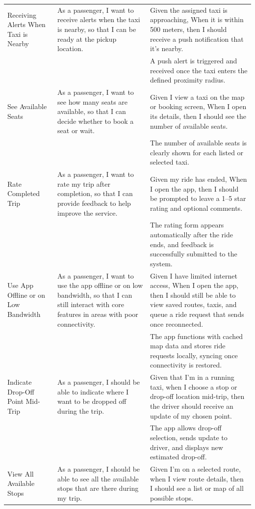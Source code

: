 \documentclass[a4paper,12pt]{article}
\begin{document}
\begin{longtable}{|p{4cm}|p{6cm}|p{5cm}|}
\hline
Receiving Alerts When Taxi is Nearby & As a passenger, I want to receive alerts when the taxi is nearby, so that I can be ready at the pickup location. & Given the assigned taxi is approaching, When it is within 500 meters, then I should receive a push notification that it’s nearby. \\
& & A push alert is triggered and received once the taxi enters the defined proximity radius. \\
\hline
See Available Seats & As a passenger, I want to see how many seats are available, so that I can decide whether to book a seat or wait. & Given I view a taxi on the map or booking screen, When I open its details, then I should see the number of available seats. \\
& & The number of available seats is clearly shown for each listed or selected taxi. \\
\hline
Rate Completed Trip & As a passenger, I want to rate my trip after completion, so that I can provide feedback to help improve the service. & Given my ride has ended, When I open the app, then I should be prompted to leave a 1–5 star rating and optional comments. \\
& & The rating form appears automatically after the ride ends, and feedback is successfully submitted to the system. \\
\hline
Use App Offline or on Low Bandwidth & As a passenger, I want to use the app offline or on low bandwidth, so that I can still interact with core features in areas with poor connectivity. & Given I have limited internet access, When I open the app, then I should still be able to view saved routes, taxis, and queue a ride request that sends once reconnected. \\
& & The app functions with cached map data and stores ride requests locally, syncing once connectivity is restored. \\
\hline
Indicate Drop-Off Point Mid-Trip & As a passenger, I should be able to indicate where I want to be dropped off during the trip. & Given that I’m in a running taxi, when I choose a stop or drop-off location mid-trip, then the driver should receive an update of my chosen point. \\
& & The app allows drop-off selection, sends update to driver, and displays new estimated drop-off. \\
\hline
View All Available Stops & As a passenger, I should be able to see all the available stops that are there during my trip. & Given I’m on a selected route, when I view route details, then I should see a list or map of all possible stops. \\

\end{longtable}
\end{document}
